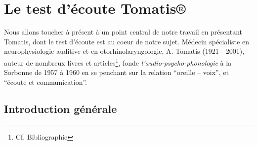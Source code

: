 \section {Le test d'écoute Tomatis®}
Nous allons toucher à présent à un point central de notre travail en présentant
Tomatis, dont le test d'écoute est au coeur de notre sujet.
Médecin spécialiste en neurophysiologie auditive et en
oto\-rhino\-la\-ryn\-go\-lo\-gie, A. Tomatis (1921 - 2001),  auteur de 
nombreux  livres et 
articles\footnote{Cf. Bibliographie}, fonde
\textit{l'audio-psycho-phonologie} à la Sorbonne de
1957 à 1960 en  se penchant sur la relation
``oreille -- voix'', et ``écoute
et communication''.
 \subsection{Introduction générale}
 
